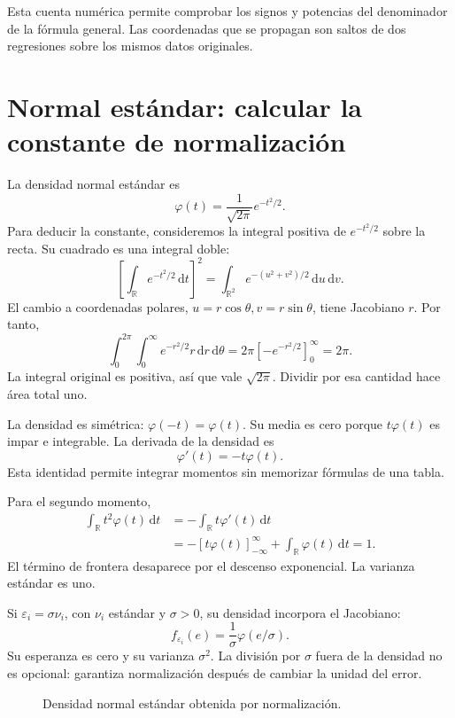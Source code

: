 \documentclass[11pt,a4paper]{article}
\newcommand{\dd}{\,\mathrm d}
\begin{document}
Esta cuenta numérica permite comprobar
los signos y potencias del denominador
de la fórmula general.
Las coordenadas que se propagan son
saltos de dos regresiones sobre
los mismos datos originales.

\clearpage
{}
\section{Normal estándar: calcular la constante de normalización}\label{unidad62}
La densidad normal estándar es
\[
\varphi(t)=\frac1{\sqrt{2\pi}}e^{-t^2/2}.
\]
Para deducir la constante, consideremos la integral
positiva de \(e^{-t^2/2}\) sobre la recta.
Su cuadrado es una integral doble:
\[
\left[\int_{\mathbb R}e^{-t^2/2}\dd t\right]^2
=\int_{\mathbb R^2}e^{-(u^2+v^2)/2}\dd u\dd v.
\]
El cambio a coordenadas polares,
\(u=r\cos\theta,v=r\sin\theta\),
tiene Jacobiano \(r\). Por tanto,
\[
\int_0^{2\pi}\int_0^\infty e^{-r^2/2}r\dd r\dd\theta
=2\pi[-e^{-r^2/2}]_0^\infty=2\pi.
\]
La integral original es positiva,
así que vale \(\sqrt{2\pi}\).
Dividir por esa cantidad hace área total uno.

La densidad es simétrica:
\(\varphi(-t)=\varphi(t)\).
Su media es cero porque \(t\varphi(t)\)
es impar e integrable.
La derivada de la densidad es
\[
\varphi'(t)=-t\varphi(t).
\]
Esta identidad permite integrar momentos
sin memorizar fórmulas de una tabla.

Para el segundo momento,
\[
\begin{aligned}
\int_{\mathbb R}t^2\varphi(t)\dd t
&=-\int_{\mathbb R}t\varphi'(t)\dd t\\
&=-[t\varphi(t)]_{-\infty}^{\infty}
+\int_{\mathbb R}\varphi(t)\dd t=1.
\end{aligned}
\]
El término de frontera desaparece
por el descenso exponencial.
La varianza estándar es uno.

Si \(\varepsilon_i=\sigma\nu_i\),
con \(\nu_i\) estándar y \(\sigma>0\),
su densidad incorpora el Jacobiano:
\[
f_{\varepsilon_i}(e)
=\frac1\sigma\varphi(e/\sigma).
\]
Su esperanza es cero y su varianza \(\sigma^2\).
La división por \(\sigma\) fuera de
la densidad no es opcional:
garantiza normalización después de
cambiar la unidad del error.

\begin{figure}[H]\centering
{}
\caption{Densidad normal estándar obtenida por normalización.}
\end{figure}
\end{document}

